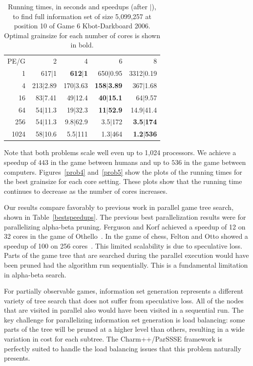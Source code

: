 \documentclass[times, 10pt,twocolumn]{article}
\begin{document}
\begin{table}[tphb]
\centering
\begin{tabular}{rrrrr}
PE/G & 2 & 4 & 6 & 8 \\
1 & 617$|$1 & {\bf 612$|$1} & 650$|$0.95 & 3312$|$0.19 \\
4 & 213$|$2.89 & 170$|$3.63 & {\bf 158$|$3.89} & 367$|$1.68 \\
16 & 83$|$7.41 & 49$|$12.4 & {\bf 40$|$15.1} & 64$|$9.57 \\
64 & 54$|$11.3 & 19$|$32.3 & {\bf 11$|$52.9} & 14.9$|$41.4 \\
256 & 54$|$11.3 & 9.8$|$62.9 & 3.5$|$172 & {\bf 3.5$|$174} \\
1024 & 58$|$10.6 & 5.5$|$111 & 1.3$|$464 & {\bf 1.2$|$536} \\
\end{tabular}

\caption{Running times, in seconds and speedups (after $|$), to find full
information set of size 5,099,257 at position 10 of Game 6 Kbot-Darkboard 2006.
Optimal grainsize for each number of cores is shown in bold.}

\vspace{-0.2in}
\label{tab:prob5}
\end{table}

Note that both problems scale well even up to 1,024 processors.  We achieve a
speedup of $443$ in the game between humans and up to $536$ in the game between
computers.  Figures~\ref{prob4} and~\ref{prob5} show the plots of the running
times for the best grainsize for each core setting.  These plots show that the
running time continues to decrease as the number of cores increases.

Our results compare favorably to previous work in parallel game tree search,
shown in Table~\ref{bestspeedups}.  The previous best parallelization results
were for parallelizing alpha-beta pruning.  Ferguson and Korf achieved a
speedup of 12 on 32 cores in the game of Othello~\cite{ferguson88distributed}.
In the game of chess, Felton and Otto showed a speedup of 100 on 256
cores~\cite{felten88highly}.  This limited scalability is due to speculative
loss.  Parts of the game tree that are searched during the parallel execution
would have been pruned had the algorithm run sequentially.  This is a
fundamental limitation in alpha-beta search. 

For partially observable games, information set generation represents a
different variety of tree search that does not suffer from speculative loss.
All of the nodes that are visited in parallel also would have been visited in a
sequential run.  The key challenge for parallelizing information set generation
is load balancing: some parts of the tree will be pruned at a higher level than
others, resulting in a wide variation in cost for each subtree.  The {\sc
Charm++/ParSSSE} framework is perfectly suited to handle the load balancing
issues that this problem naturally presents.
\end{document}
